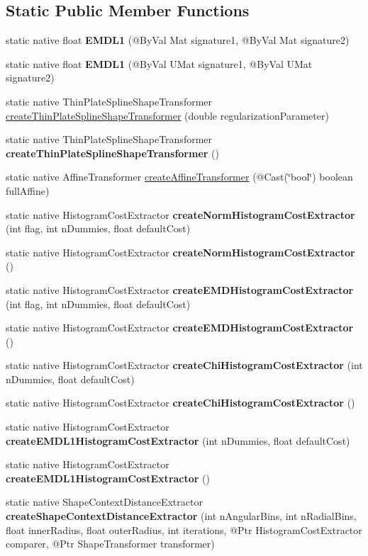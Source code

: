 \subsection*{Static Public Member Functions}
\begin{DoxyCompactItemize}
\item 
static native float {\bfseries E\+M\+D\+L1} (@By\+Val Mat signature1, @By\+Val Mat signature2)
\item 
static native float {\bfseries E\+M\+D\+L1} (@By\+Val U\+Mat signature1, @By\+Val U\+Mat signature2)
\item 
static native Thin\+Plate\+Spline\+Shape\+Transformer \hyperlink{group__shape_ga409dbca0ecf803197cc29ec102f593fd}{create\+Thin\+Plate\+Spline\+Shape\+Transformer} (double regularization\+Parameter)
\item 
static native Thin\+Plate\+Spline\+Shape\+Transformer {\bfseries create\+Thin\+Plate\+Spline\+Shape\+Transformer} ()
\item 
static native Affine\+Transformer \hyperlink{group__shape_gaf6ba7c375194bc18e7f3212dfadfa68f}{create\+Affine\+Transformer} (@Cast(\char`\"{}bool\char`\"{}) boolean full\+Affine)
\item 
static native Histogram\+Cost\+Extractor {\bfseries create\+Norm\+Histogram\+Cost\+Extractor} (int flag, int n\+Dummies, float default\+Cost)
\item 
static native Histogram\+Cost\+Extractor {\bfseries create\+Norm\+Histogram\+Cost\+Extractor} ()
\item 
static native Histogram\+Cost\+Extractor {\bfseries create\+E\+M\+D\+Histogram\+Cost\+Extractor} (int flag, int n\+Dummies, float default\+Cost)
\item 
static native Histogram\+Cost\+Extractor {\bfseries create\+E\+M\+D\+Histogram\+Cost\+Extractor} ()
\item 
static native Histogram\+Cost\+Extractor {\bfseries create\+Chi\+Histogram\+Cost\+Extractor} (int n\+Dummies, float default\+Cost)
\item 
static native Histogram\+Cost\+Extractor {\bfseries create\+Chi\+Histogram\+Cost\+Extractor} ()
\item 
static native Histogram\+Cost\+Extractor {\bfseries create\+E\+M\+D\+L1\+Histogram\+Cost\+Extractor} (int n\+Dummies, float default\+Cost)
\item 
static native Histogram\+Cost\+Extractor {\bfseries create\+E\+M\+D\+L1\+Histogram\+Cost\+Extractor} ()
\item 
static native Shape\+Context\+Distance\+Extractor {\bfseries create\+Shape\+Context\+Distance\+Extractor} (int n\+Angular\+Bins, int n\+Radial\+Bins, float inner\+Radius, float outer\+Radius, int iterations, @Ptr Histogram\+Cost\+Extractor comparer, @Ptr Shape\+Transformer transformer)

\end{DoxyCompactItemize}

